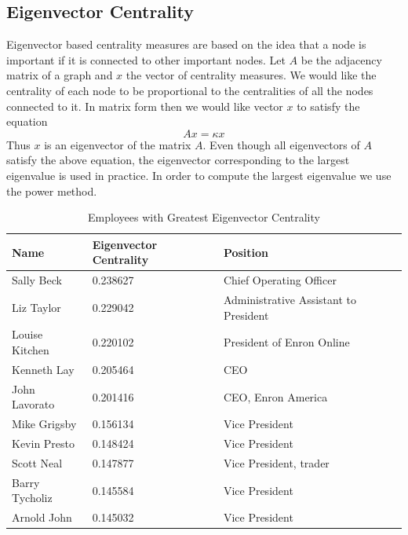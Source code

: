 \documentclass[12pt]{article}
\begin{document}
	\subsection{Eigenvector Centrality} Eigenvector based centrality measures are based on the idea that a node is important if it is connected to other important nodes. Let $A$ be the adjacency matrix of a graph and $x$ the vector of centrality measures. We would like the centrality of each node to be proportional to the centralities of all the nodes connected to it. In matrix form then we would like vector $x$ to satisfy the equation
		\begin{equation}
			A x = \kappa x
		\end{equation}
		Thus $x$ is an eigenvector of the matrix $A$. Even though all eigenvectors of $A$ satisfy the above equation, the eigenvector corresponding to the largest eigenvalue is used in practice. In order to compute the largest eigenvalue we use the power method.
		
        \begin{table}[h]
        \caption{Employees with Greatest Eigenvector Centrality}
        \centering
        \begin{tabular}{|l|l|l|}
        \hline
        \textbf{Name }          & \textbf{Eigenvector Centrality} & \textbf{Position}                              \\ \hline
        Sally Beck     & 0.238627               & Chief Operating Officer               \\ \hline
        Liz Taylor     & 0.229042               & Administrative Assistant to President \\ \hline
        Louise Kitchen & 0.220102               & President of Enron Online             \\ \hline
        Kenneth Lay    & 0.205464               & CEO                                   \\ \hline
        John Lavorato  & 0.201416               & CEO, Enron America                    \\ \hline
        Mike Grigsby   & 0.156134               & Vice President                        \\ \hline
        Kevin Presto   & 0.148424               & Vice President                        \\ \hline
        Scott Neal     & 0.147877               & Vice President, trader                \\ \hline
        Barry Tycholiz & 0.145584               & Vice President                        \\ \hline
        Arnold John    & 0.145032               & Vice President                        \\ \hline
        \end{tabular}
        \end{table}
	
\end{document}
